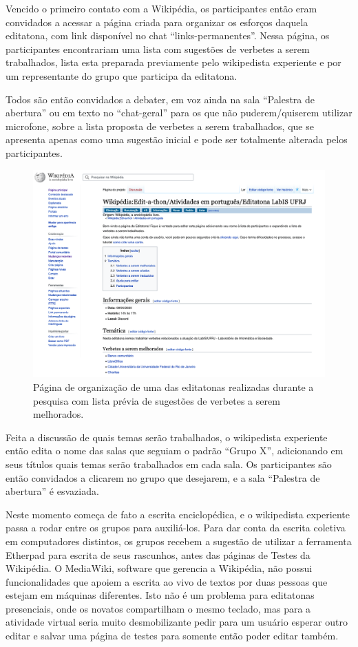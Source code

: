  Vencido o primeiro contato com a Wikipédia, os participantes então eram convidados a acessar a página criada para organizar os esforços daquela editatona, com link disponível no chat “links-permanentes”. Nessa página, os participantes encontrariam uma lista com sugestões de verbetes a serem trabalhados, lista esta preparada previamente pelo wikipedista experiente e por um representante do grupo que participa da editatona.
 
 Todos são então convidados a debater, em voz ainda na sala “Palestra de abertura” ou em texto no “chat-geral” para os que não puderem/quiserem utilizar microfone, sobre a lista proposta de verbetes a serem trabalhados, que se apresenta apenas como uma sugestão inicial e pode ser totalmente alterada pelos participantes.


\begin{figure}[H]
    \centering
    \includegraphics[width=1\textwidth]{Images/pagina_editatona.png}
    \caption{Página de organização de uma das editatonas realizadas durante a pesquisa com lista prévia de sugestões de verbetes a serem melhorados.}
    \label{fig:pagina_editatona}
\end{figure}

 
 Feita a discussão de quais temas serão trabalhados, o wikipedista experiente então edita o nome das salas que seguiam o padrão ``Grupo X'', adicionando em seus títulos quais temas serão trabalhados em cada sala. Os participantes são então convidados a clicarem no grupo que desejarem, e a sala ``Palestra de abertura'' é esvaziada.
 
 Neste momento começa de fato a escrita enciclopédica, e o wikipedista experiente passa a rodar entre os grupos para auxiliá-los. Para dar conta da escrita coletiva em computadores distintos, os grupos recebem a sugestão de utilizar a ferramenta Etherpad para escrita de seus rascunhos, antes das páginas de Testes da Wikipédia. O MediaWiki, software que gerencia a Wikipédia, não possui funcionalidades que apoiem a escrita ao vivo de textos por duas pessoas que estejam em máquinas diferentes. Isto não é um problema para editatonas presenciais, onde os novatos compartilham o mesmo teclado, mas para a atividade virtual seria muito desmobilizante pedir para um usuário esperar outro editar e salvar uma página de testes para somente então poder editar também.
 
